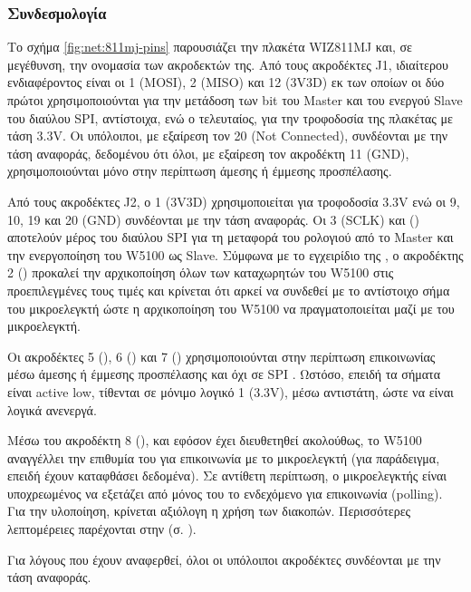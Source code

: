 \subsubsection{Συνδεσμολογία}

Το σχήμα \ref{fig:net:811mj-pins} παρουσιάζει την πλακέτα WIZ811MJ και, σε
μεγέθυνση, την ονομασία των ακροδεκτών της. Από τους ακροδέκτες J1, ιδιαίτερου
ενδιαφέροντος είναι οι 1 (MOSI), 2 (MISO) και 12 (3V3D) εκ των οποίων οι δύο
πρώτοι χρησιμοποιούνται για την μετάδοση των bit του \textenglish{Master} και
του ενεργού \textenglish{Slave} του διαύλου SPI, αντίστοιχα, ενώ ο τελευταίος,
για την τροφοδοσία της πλακέτας με τάση 3.3V. Οι υπόλοιποι, με εξαίρεση τον 20
(\textenglish{Not Connected}), συνδέονται με την τάση αναφοράς, δεδομένου ότι
όλοι, με εξαίρεση τον ακροδέκτη 11 (GND), χρησιμοποιούνται μόνο στην περίπτωση
άμεσης ή έμμεσης προσπέλασης.

Από τους ακροδέκτες J2, ο 1 (3V3D) χρησιμοποιείται για τροφοδοσία 3.3V ενώ οι
9, 10, 19 και 20 (GND) συνδέονται με την τάση αναφοράς. Οι 3 (SCLK) και
() αποτελούν μέρος του διαύλου SPI για τη μεταφορά του ρολογιού από
το \textenglish{Master} και την ενεργοποίηση του W5100 ως \textenglish{Slave}.
Σύμφωνα με το εγχειρίδιο της \textcite[8]{wiz13:811mj}, ο ακροδέκτης 2
() προκαλεί την αρχικοποίηση όλων των καταχωρητών του W5100 στις
προεπιλεγμένες τους τιμές και κρίνεται ότι αρκεί να συνδεθεί με το αντίστοιχο
σήμα του μικροελεγκτή ώστε η αρχικοποίηση του W5100 να πραγματοποιείται μαζί
με του μικροελεγκτή.

Οι ακροδέκτες 5 (), 6 () και 7 () χρησιμοποιούνται
στην περίπτωση επικοινωνίας μέσω άμεσης ή έμμεσης προσπέλασης και όχι σε SPI
\parencite[8]{wiz11:w5100}. Ωστόσο, επειδή τα σήματα είναι
\textenglish{active low}, τίθενται σε μόνιμο λογικό 1 (3.3V), μέσω αντιστάτη,
ώστε να είναι λογικά ανενεργά.

Μέσω του ακροδέκτη 8 (), και εφόσον έχει διευθετηθεί ακολούθως, το
W5100 αναγγέλλει την επιθυμία του για επικοινωνία με το μικροελεγκτή (για
παράδειγμα, επειδή έχουν καταφθάσει δεδομένα). Σε αντίθετη περίπτωση, ο
μικροελεγκτής είναι υποχρεωμένος να εξετάζει από μόνος του το ενδεχόμενο για
επικοινωνία (\textenglish{polling}). Για την υλοποίηση, κρίνεται αξιόλογη η
χρήση των διακοπών. Περισσότερες λεπτομέρειες παρέχονται στην
 (σ. \pageref{ssubsec:network:ir_imr}).

Για λόγους που έχουν αναφερθεί, όλοι οι υπόλοιποι ακροδέκτες συνδέονται με την
τάση αναφοράς.

